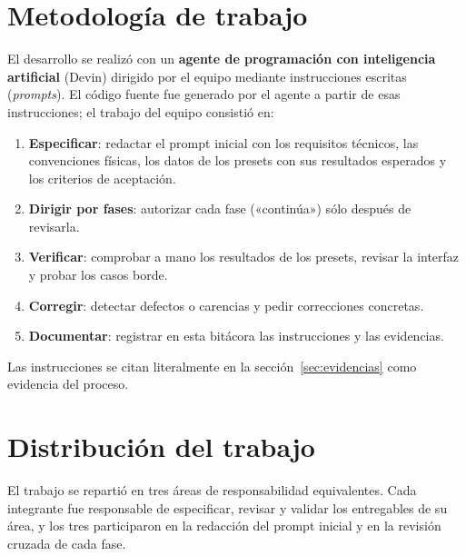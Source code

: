 \documentclass[11pt,a4paper]{article}
\begin{document}
\section{Metodología de trabajo}

El desarrollo se realizó con un \textbf{agente de programación con inteligencia artificial} (Devin)
dirigido por el equipo mediante instrucciones escritas (\emph{prompts}). El código fuente fue generado
por el agente a partir de esas instrucciones; el trabajo del equipo consistió en:

\begin{enumerate}
  \item \textbf{Especificar}: redactar el prompt inicial con los requisitos técnicos, las convenciones
        físicas, los datos de los presets con sus resultados esperados y los criterios de aceptación.
  \item \textbf{Dirigir por fases}: autorizar cada fase («continúa») sólo después de revisarla.
  \item \textbf{Verificar}: comprobar a mano los resultados de los presets, revisar la interfaz y
        probar los casos borde.
  \item \textbf{Corregir}: detectar defectos o carencias y pedir correcciones concretas.
  \item \textbf{Documentar}: registrar en esta bitácora las instrucciones y las evidencias.
\end{enumerate}

Las instrucciones se citan literalmente en la sección~\ref{sec:evidencias} como evidencia del proceso.

\section{Distribución del trabajo}

El trabajo se repartió en tres áreas de responsabilidad equivalentes. Cada integrante fue responsable
de especificar, revisar y validar los entregables de su área, y los tres participaron en la redacción del
prompt inicial y en la revisión cruzada de cada fase.
\end{document}
